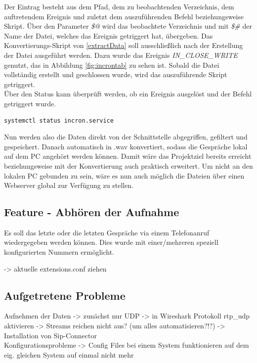 Der Eintrag besteht aus dem Pfad, dem zu beobachtenden Verzeichnis, dem auftretendem Ereignis und zuletzt dem auszuführenden Befehl beziehungsweise Skript. Über den Parameter \textit{\$@}  wird das beobachtete Verzeichnis und mit \textit{\$\#} der Name der Datei, welches das Ereignis getriggert hat, übergeben. Das Konvertierungs-Skript von \ref{extractData} soll ausschließlich nach der Erstellung der Datei ausgeführt werden. Dazu wurde das Ereignis \textit{IN\_CLOSE\_WRITE} genutzt, das in Abbildung \ref{fig:incrontab} zu sehen ist. Sobald die Datei vollständig erstellt und geschlossen wurde, wird das auszuführende Skript getriggert.\\

Über den Status kann überprüft werden, ob ein Ereignis ausgelöst und der Befehl getriggert wurde.

\begin{lstlisting}
systemctl status incron.service
\end{lstlisting}


Nun werden also die Daten direkt von der Schnittstelle abgegriffen, gefiltert und gespeichert. Danach automatisch in .wav konvertiert, sodass die Gespräche lokal auf dem PC angehört werden können. Damit wäre das Projektziel bereits erreicht beziehungsweise mit der Konvertierung auch praktisch erweitert. Um nicht an den lokalen PC gebunden zu sein, wäre es nun auch möglich die Dateien über einen Webserver global zur Verfügung zu stellen.

\subsection{Feature - Abhören der Aufnahme}
Es soll das letzte oder die letzten Gespräche via einem Telefonanruf wiedergegeben werden können. Dies wurde mit einer/mehreren speziell konfigurierten Nummern ermöglicht.

-> aktuelle extensions.conf ziehen


\subsection{Aufgetretene Probleme}

Aufnehmen der Daten -> zunächst nur UDP -> in Wireshark Protokoll rtp\_udp aktivieren -> Streams reichen nicht aus? (um alles automatisieren?!?) -> Installation von Sip-Connector\\

Konfigurationsprobleme -> Config Files bei einem System funktionieren auf dem eig. gleichen System auf einmal nicht mehr\\

